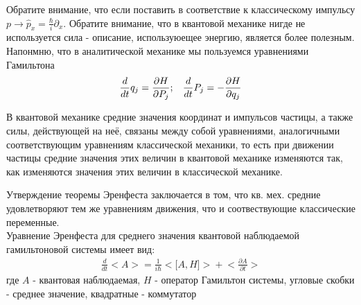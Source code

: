\documentclass[__main__.tex]{subfiles}
\begin{document}
Обратите внимание, что если поставить в соответствие к классическому импульсу $p \rightarrow \widehat{p}_x = \frac{\hbar}{i}\partial_x$. Обратите внимание, что в квантовой механике нигде не используется сила - описание, используюещее энергию, является более полезным.\\
Напонмню, что в аналитической механике мы пользуемся уравнениями Гамильтона
\begin{gather*}
\frac{d}{dt}q_j = \frac{\partial{H}}{\partial{P_j}}; \hspace{3mm} \frac{d}{dt}P_j = -\frac{\partial{H}}{\partial{q_j}}
\end{gather*}
\begin{theorem}
	В квантовой механике средние значения координат и импульсов частицы, а также силы, действующей на неё, связаны между собой уравнениями, аналогичными соответствующим уравнениям классической механики, то есть при движении частицы средние значения этих величин в квантовой механике изменяются так, как изменяются значения этих величин в классической механике.
\end{theorem}
Утверждение теоремы Эренфеста заключается в том, что кв. мех. средние удовлетворяют тем же уравнениям движения, что и соотвествующие классические переменные.\\
Уравнение Эренфеста для среднего значения квантовой наблюдаемой гамильтоновой системы имеет вид:\\
\begin{gather*}
\frac{d}{dt}\big<A\big> = \frac{1}{i\hbar}\big<\big[A,H\big]\big> + \bigg<\frac{\partial{A}}{\partial{t}}\bigg>
\end{gather*}
где $A$ - квантовая наблюдаемая, $H$ - оператор Гамильтон системы, угловые скобки - среднее значение, квадратные - коммутатор
\end{document}
